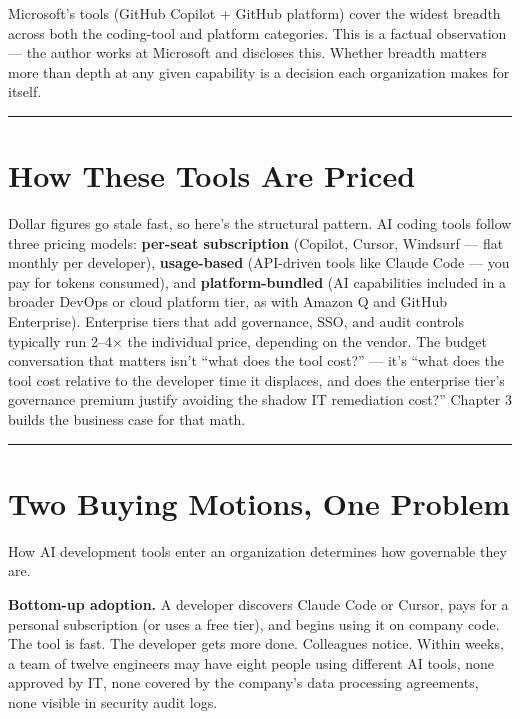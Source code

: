 \documentclass[
  a4paper,
  DIV=11,
  numbers=noendperiod]{scrreprt}
\newcounter{none} %
\begin{document}
Microsoft's tools (GitHub Copilot + GitHub platform) cover the widest
breadth across both the coding-tool and platform categories. This is a
factual observation --- the author works at Microsoft and discloses
this. Whether breadth matters more than depth at any given capability is
a decision each organization makes for itself.

\begin{center}\rule{0.5\linewidth}{0.5pt}\end{center}

\section{How These Tools Are Priced}\label{how-these-tools-are-priced}

Dollar figures go stale fast, so here's the structural pattern. AI
coding tools follow three pricing models: \textbf{per-seat subscription}
(Copilot, Cursor, Windsurf --- flat monthly per developer),
\textbf{usage-based} (API-driven tools like Claude Code --- you pay for
tokens consumed), and \textbf{platform-bundled} (AI capabilities
included in a broader DevOps or cloud platform tier, as with Amazon Q
and GitHub Enterprise). Enterprise tiers that add governance, SSO, and
audit controls typically run 2--4× the individual price, depending on
the vendor. The budget conversation that matters isn't ``what does the
tool cost?'' --- it's ``what does the tool cost relative to the
developer time it displaces, and does the enterprise tier's governance
premium justify avoiding the shadow IT remediation cost?'' Chapter 3
builds the business case for that math.

\begin{center}\rule{0.5\linewidth}{0.5pt}\end{center}

\section{Two Buying Motions, One
Problem}\label{two-buying-motions-one-problem}

How AI development tools enter an organization determines how governable
they are.

\textbf{Bottom-up adoption.} A developer discovers Claude Code or
Cursor, pays for a personal subscription (or uses a free tier), and
begins using it on company code. The tool is fast. The developer gets
more done. Colleagues notice. Within weeks, a team of twelve engineers
may have eight people using different AI tools, none approved by IT,
none covered by the company's data processing agreements, none visible
in security audit logs.
\end{document}
